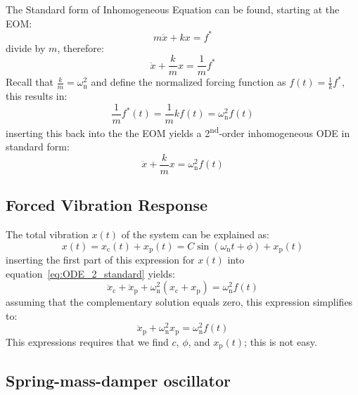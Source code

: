 \documentclass[12pt,letter]{article}
\numberwithin{ex}{section} %
\numberwithin{re}{section} %
\numberwithin{equation}{section}	%
\begin{document}
The Standard form of Inhomogeneous Equation can be found, starting at the EOM:
\begin{equation}
m \ddot{x} + kx = f^*
\end{equation}
divide by $m$, therefore:
\begin{equation}
\ddot{x} + \frac{k}{m}x = \frac{1}{m}f^*
\end{equation}
Recall that $\frac{k}{m} = \omega_\text{n}^2$ and define the normalized forcing function as $f(t) = \frac{1}{k}f^*$, this results in:
\begin{equation}
\frac{1}{m}f^*(t) = \frac{1}{m}kf(t) = \omega_\text{n}^2 f(t)
\end{equation}
inserting this back into the the EOM yields a 2\textsuperscript{nd}-order inhomogeneous ODE in standard form:
\begin{equation}
\ddot{x} + \frac{k}{m}x = \omega_\text{n}^2 f(t)
\label{eq:ODE_2_standard}
\end{equation}


\subsection{Forced Vibration Response}

The total vibration $x(t)$ of the system can be explained as:
\begin{equation}
x(t) = x_\text{c}(t) + x_\text{p}(t) = C \sin(\omega_\text{n}t + \phi) + x_\text{p}(t)
\end{equation}
inserting the first part of this expression for $x(t)$ into equation~\ref{eq:ODE_2_standard} yields:
\begin{equation}
\ddot{x}_\text{c} + \ddot{x}_\text{p} + \omega_\text{n}^2(x_\text{c} + x_\text{p}) = \omega_\text{n}^2 f(t)
\end{equation}
assuming that the complementary solution equals zero, this expression simplifies to:
\begin{equation}
\ddot{x}_\text{p} + \omega_\text{n}^2x_\text{p} = \omega_\text{n}^2 f(t)
\end{equation}
This expressions requires that we find $c$, $\phi$, and $x_\text{p}(t)$; this is not easy. 

\subsection{Spring-mass-damper oscillator}
\end{document}
